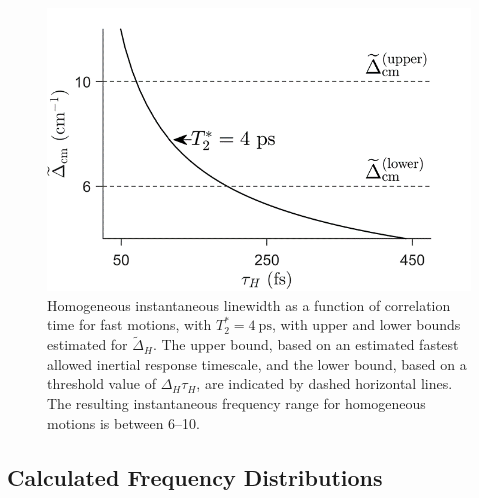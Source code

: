 \documentclass[%
  class = book,%
  crop = false,%
  float = true,%
  multi = true,%
  preview = false,%
]{standalone}
\begin{document}
\begin{figure}
  \centering
  \includegraphics[width=\textwidth]{figure4.png}
  \caption[Linewidth dependence on correlation time for fast motions]{Homogeneous instantaneous linewidth as a function of correlation time for fast motions, with \(T_{2}^{*} = \SI{4}{\pico\second}\), with upper and lower bounds estimated for \({\widetilde{\Delta}}_{H}\). The upper bound, based on an estimated fastest allowed inertial response timescale, and the lower bound, based on a threshold value of \(\Delta_{H}\tau_{H}\), are indicated by dashed horizontal lines. The resulting instantaneous frequency range for homogeneous motions is between \SIrange{6}{10}{\wavenumber}.}
  \label{paper_03:fig4}
\end{figure}

\subsection{Calculated Frequency Distributions}
\label{paper_03:ssec:V-B}
\end{document}
